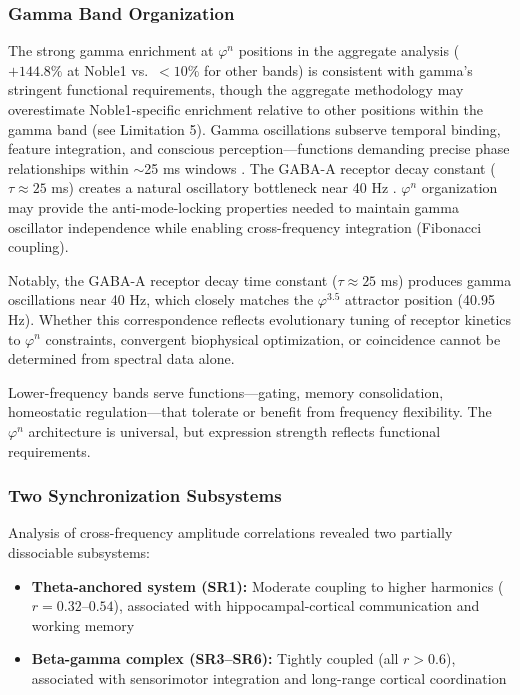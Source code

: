 \documentclass[11pt,a4paper]{article}
\newcommand{\phisym}{\varphi}
\begin{document}
\subsubsection{Gamma Band Organization}
The strong gamma enrichment at $\phisym^n$ positions in the aggregate analysis ($+144.8\%$ at Noble1 vs.\ $<10\%$ for other bands) is consistent with gamma's stringent functional requirements, though the aggregate methodology may overestimate Noble1-specific enrichment relative to other positions within the gamma band (see Limitation 5). Gamma oscillations subserve temporal binding, feature integration, and conscious perception---functions demanding precise phase relationships within $\sim$25 ms windows \parencite{canolty2010functional, lisman2013thetagamma}. The GABA-A receptor decay constant ($\tau \approx 25$ ms) creates a natural oscillatory bottleneck near 40 Hz \parencite{bartos2007synaptic}. $\phisym^n$ organization may provide the anti-mode-locking properties needed to maintain gamma oscillator independence while enabling cross-frequency integration (Fibonacci coupling).

Notably, the GABA-A receptor decay time constant ($\tau \approx 25$ ms) produces gamma oscillations near 40 Hz, which closely matches the $\phisym^{3.5}$ attractor position (40.95 Hz). Whether this correspondence reflects evolutionary tuning of receptor kinetics to $\phisym^n$ constraints, convergent biophysical optimization, or coincidence cannot be determined from spectral data alone.

Lower-frequency bands serve functions---gating, memory consolidation, homeostatic regulation---that tolerate or benefit from frequency flexibility. The $\phisym^n$ architecture is universal, but expression strength reflects functional requirements.

\subsubsection{Two Synchronization Subsystems}
Analysis of cross-frequency amplitude correlations revealed two partially dissociable subsystems:
\begin{itemize}
    \item \textbf{Theta-anchored system (SR1):} Moderate coupling to higher harmonics ($r = 0.32$--$0.54$), associated with hippocampal-cortical communication and working memory \parencite{hyman2005medial}
    \item \textbf{Beta-gamma complex (SR3--SR6):} Tightly coupled (all $r > 0.6$), associated with sensorimotor integration and long-range cortical coordination \parencite{engel2010beta}
\end{itemize}
\end{document}
